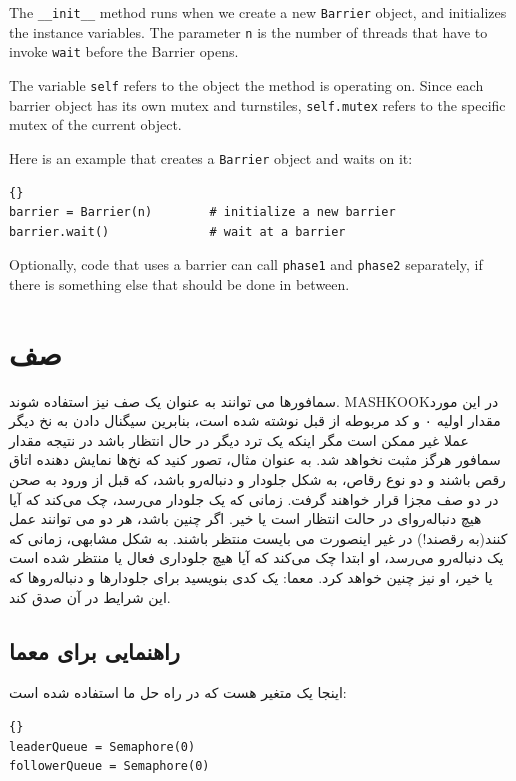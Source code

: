 \documentclass{book}
\newcommand{\clearemptydoublepage}{\newpage\cleardoublepage}
\begin{document}
The {\tt \_\_init\_\_} method runs when we create a new
{\tt Barrier} object, and initializes the instance variables.
The parameter {\tt n} is the number of threads that have
to invoke {\tt wait} before the Barrier opens.

The variable {\tt self} refers to the object the method
is operating on.  Since each barrier object has its own
mutex and turnstiles, {\tt self.mutex} refers to the specific
mutex of the current object.

Here is an example that creates a {\tt Barrier}
object and waits on it:

\begin{lstlisting}[title={Barrier interface}]{}
barrier = Barrier(n)        # initialize a new barrier
barrier.wait()              # wait at a barrier
\end{lstlisting}

Optionally, code that uses a barrier can call {\tt phase1} and
{\tt phase2} separately, if there is something else that
should be done in between.



\section{صف}
\label{dancers}

سمافور‌ها می توانند به عنوان یک صف نیز استفاده شوند. {MASHKOOK}در این مورد مقدار اولیه ۰ و کد مربوطه از قبل نوشته شده است، بنابرین سیگنال دادن به نخ دیگر عملا غیر ممکن است مگر اینکه یک ترد دیگر در حال انتظار باشد در نتیجه مقدار سمافور هرگز مثبت نخواهد شد.
به عنوان مثال، تصور کنید که نخ‌ها نمایش دهنده اتاق رقص باشند و دو نوع رقاص، به شکل جلودار و دنباله‌رو باشد، که قبل از ورود به صحن در دو صف مجزا قرار خواهند گرفت. زمانی که یک جلودار می‌رسد، چک می‌کند که آیا هیچ دنباله‌رو‌ای در حالت انتظار است یا خیر. اگر چنین باشد، هر دو می توانند عمل کنند(به رقصند!) در غیر اینصورت می بایست منتظر باشند.
به شکل مشابهی، زمانی که یک دنباله‌رو می‌رسد، او ابتدا چک می‌کند که آیا هیچ جلو‌داری فعال یا منتظر شده است یا خیر، او نیز چنین خواهد کرد.
معما: یک کدی بنویسید برای جلو‌دارها و دنباله‌رو‌ها که این شرایط در آن صدق کند.


\clearemptydoublepage
\subsection {راهنمایی برای معما}

اینجا یک متغیر
هست که در راه حل ما استفاده شده است:

\begin{lstlisting}[title={Queue hint}]{}
leaderQueue = Semaphore(0)
followerQueue = Semaphore(0)
\end{lstlisting}
\end{document}
